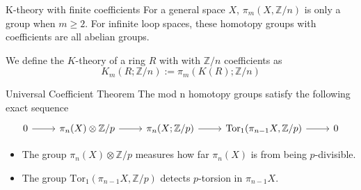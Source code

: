 \documentclass{beamer}
\begin{document}
\begin{frame}{K-theory with finite coefficients}
  For a general space $X$, $\pi_m(X, \mathbb{Z}/n)$  is only a group when $m\geq 2$. For infinite loop spaces, these homotopy groups with coefficients are all abelian groups. 

  \begin{definition}
    We define the $K$-theory of a ring $R$ with with $\mathbb{Z}/n$ coefficients as 
    \[K_m(R; \mathbb{Z}/n):= \pi_m(K(R); \mathbb{Z}/n)\]
  \end{definition}

\end{frame}
































\begin{frame}[fragile]{Universal Coefficient Theorem}
The mod n homotopy groups satisfy the following exact sequence 
\[\begin{tikzcd}
	0 & {\pi_n(X)\otimes\mathbb{Z}/p} & {\pi_n(X;\mathbb{Z}/p)} & {\textrm{Tor}_1(\pi_{n-1}X, \mathbb{Z}/p)} & 0
	\arrow[from=1-1, to=1-2]
	\arrow[from=1-2, to=1-3]
	\arrow[from=1-3, to=1-4]
	\arrow[from=1-4, to=1-5]
\end{tikzcd}\]

\begin{itemize}
  \item The group $\pi_n(X)\otimes\mathbb{Z}/p$ measures how far $\pi_n(X)$ is from being $p$-divisible.
  \item The group $\textrm{Tor}_1(\pi_{n-1}X, \mathbb{Z}/p)$ detects $p$-torsion in $\pi_{n-1}X$.
\end{itemize}













\end{frame}
\end{document}
